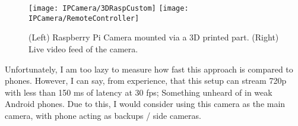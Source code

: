 \begin{figure}[!htb]
    \centering
    \texttt{[image: IPCamera/3DRaspCustom]}
    \texttt{[image: IPCamera/RemoteController]}
    \caption{
        (Left) Raspberry Pi Camera mounted via a 3D printed part. (Right) Live video feed of the camera.
    }
\end{figure}


Unfortunately, I am too lazy to measure how fast this approach is compared to phones. However, I can say, from experience, that this setup can stream 720p with less than 150 ms of latency at 30 fps; Something unheard of in weak Android phones. Due to this, I would consider using this camera as the main camera, with phone acting as backups / side cameras.
